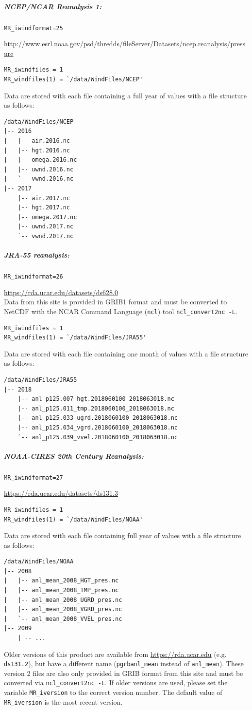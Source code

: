 \documentclass[11pt]{article}   %
\begin{document}
\subparagraph{NCEP/NCAR Reanalysis 1:}
\texttt{MR\_iwindformat=25}

\url{http://www.esrl.noaa.gov/psd/thredds/fileServer/Datasets/ncep.reanalysis/pressure}
\begin{verbatim}
MR_iwindfiles = 1
MR_windfiles(1) = `/data/WindFiles/NCEP'
\end{verbatim}
Data are stored with each file containing a full year of values with a file structure as follows:
\begin{verbatim}
/data/WindFiles/NCEP
|-- 2016
|   |-- air.2016.nc
|   |-- hgt.2016.nc
|   |-- omega.2016.nc
|   |-- uwnd.2016.nc
|   `-- vwnd.2016.nc
|-- 2017
    |-- air.2017.nc
    |-- hgt.2017.nc
    |-- omega.2017.nc
    |-- uwnd.2017.nc
    `-- vwnd.2017.nc
\end{verbatim}

\subparagraph{JRA-55 reanalysis:}
\texttt{MR\_iwindformat=26}

\url{https://rda.ucar.edu/datasets/ds628.0}\\
Data from this site is provided in GRIB1 format and must be converted to NetCDF
with the NCAR Command Language (\texttt{ncl}) tool \texttt{ncl\_convert2nc -L}.
\begin{verbatim}
MR_iwindfiles = 1
MR_windfiles(1) = `/data/WindFiles/JRA55'
\end{verbatim}
Data are stored with each file containing one month of values with a file structure as follows:
\begin{verbatim}
/data/WindFiles/JRA55
|-- 2018
    |-- anl_p125.007_hgt.2018060100_2018063018.nc
    |-- anl_p125.011_tmp.2018060100_2018063018.nc
    |-- anl_p125.033_ugrd.2018060100_2018063018.nc
    |-- anl_p125.034_vgrd.2018060100_2018063018.nc
    `-- anl_p125.039_vvel.2018060100_2018063018.nc
\end{verbatim}

\subparagraph{NOAA-CIRES 20th Century Reanalysis:}
\texttt{MR\_iwindformat=27}

\url{https://rda.ucar.edu/datasets/ds131.3}
\begin{verbatim}
MR_iwindfiles = 1
MR_windfiles(1) = `/data/WindFiles/NOAA'
\end{verbatim}
Data are stored with each file containing full year of values with a file structure as follows:
\begin{verbatim}
/data/WindFiles/NOAA
|-- 2008
|   |-- anl_mean_2008_HGT_pres.nc
|   |-- anl_mean_2008_TMP_pres.nc
|   |-- anl_mean_2008_UGRD_pres.nc
|   |-- anl_mean_2008_VGRD_pres.nc
|   `-- anl_mean_2008_VVEL_pres.nc
|-- 2009
    | -- ...
\end{verbatim}
Older versions of this product are available from \url{https://rda.ucar.edu} (e.g. \texttt{ds131.2}),
but have a different name (\texttt{pgrbanl\_mean} instead of \texttt{anl\_mean}). These version 2
files are also only provided in GRIB format from this site and must be converted via \texttt{ncl\_convert2nc -L}.
If older versions are used, please set the variable \texttt{MR\_iversion} to the correct version number.
The default value of \texttt{MR\_iversion} is the most recent version.
\end{document}
